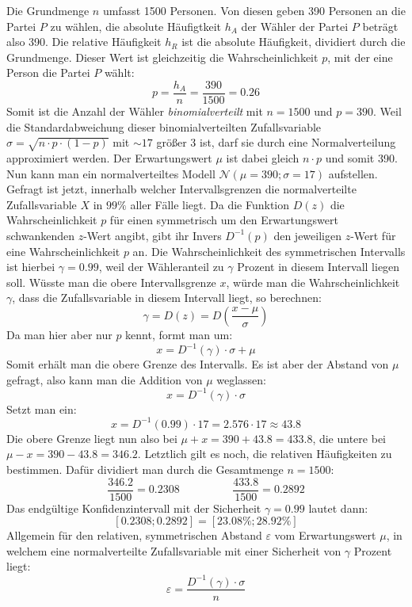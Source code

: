 Die Grundmenge $n$ umfasst 1500 Personen. Von diesen geben 390 Personen an die Partei $P$ zu w\"{a}hlen, die absolute H\"{a}ufigtkeit $h_A$ der W\"{a}hler der Partei $P$ betr\"{a}gt also 390. Die relative H\"{a}ufigkeit $h_R$ ist die absolute H\"{a}ufigkeit, dividiert durch die Grundmenge. Dieser Wert ist gleichzeitig die Wahrscheinlichkeit $p$, mit der eine Person die Partei $P$ w\"{a}hlt: $$p = \frac{h_A}{n} = \frac{390}{1500} = 0.26$$ Somit ist die Anzahl der W\"{a}hler \emph{binomialverteilt} mit $n=1500$ und $p=390$. Weil die Standardabweichung dieser binomialverteilten Zufallsvariable $\sigma = \sqrt{n \cdot p \cdot (1 - p)}$ mit $\sim 17$ gr\"{o}\ss{}er 3 ist, darf sie durch eine Normalverteilung approximiert werden. Der Erwartungswert $\mu$ ist dabei gleich $n \cdot p$ und somit 390. Nun kann man ein normalverteiltes Modell $\mathcal{N}(\mu=390; \sigma=17)$ aufstellen. Gefragt ist jetzt, innerhalb welcher Intervallsgrenzen die normalverteilte Zufallsvariable $X$ in $99\%$ aller F\"{a}lle liegt. Da die Funktion $D(z)$ die Wahrscheinlichkeit $p$ f\"{u}r einen symmetrisch um den Erwartungswert schwankenden $z$-Wert angibt, gibt ihr Invers $D^{-1}(p)$ den jeweiligen $z$-Wert f\"{u}r eine Wahrscheinlichkeit $p$ an. Die Wahrscheinlichkeit des symmetrischen Intervalls ist hierbei $\gamma = 0.99$, weil der W\"{a}hleranteil zu $\gamma$ Prozent in diesem Intervall liegen soll. W\"{u}sste man die obere Intervallsgrenze $x$, w\"{u}rde man die Wahrscheinlichkeit $\gamma$, dass die Zufallsvariable in diesem Intervall liegt, so berechnen: $$\gamma = D(z) = D(\frac{x - \mu}{\sigma})$$ Da man hier aber nur $p$ kennt, formt man um: $$x = D^{-1}(\gamma) \cdot \sigma + \mu$$ Somit erh\"{a}lt man die obere Grenze des Intervalls. Es ist aber der Abstand von $\mu$ gefragt, also kann man die Addition von $\mu$ weglassen: $$x = D^{-1}(\gamma) \cdot \sigma$$ Setzt man ein: $$x = D^{-1}(0.99) \cdot 17 = 2.576 \cdot 17 \approx 43.8$$ Die obere Grenze liegt nun also bei $\mu + x = 390 + 43.8 = 433.8$, die untere bei $\mu - x = 390 - 43.8 = 346.2$. Letztlich gilt es noch, die relativen H\"{a}ufigkeiten zu bestimmen. Daf\"{u}r dividiert man durch die Gesamtmenge $n = 1500$: $$\frac{346.2}{1500} = 0.2308 \hspace{2cm} \frac{433.8}{1500} = 0.2892$$ Das endg\"{u}ltige Konfidenzintervall mit der Sicherheit $\gamma = 0.99$ lautet dann: $$[0.2308; 0.2892] = [23.08\% ; 28.92\%]$$ Allgemein f\"{u}r den relativen, symmetrischen Abstand $\varepsilon$ vom Erwartungswert $\mu$, in welchem eine normalverteilte Zufallsvariable mit einer Sicherheit von $\gamma$ Prozent liegt: $$\varepsilon = \frac{D^{-1}(\gamma) \cdot \sigma}{n}$$

